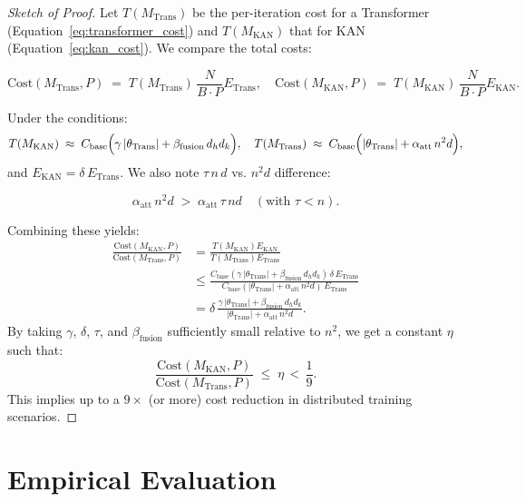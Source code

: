\documentclass[11pt]{article}
\begin{document}
\begin{proof}[Sketch of Proof]
Let $T(M_{\mathrm{Trans}})$ be the per-iteration cost for a Transformer (Equation~\ref{eq:transformer_cost}) and $T(M_{\mathrm{KAN}})$ that for KAN (Equation~\ref{eq:kan_cost}). We compare the total costs:

\[
    \mathrm{Cost}(M_{\mathrm{Trans}}, P) \;=\; T(M_{\mathrm{Trans}}) \,\frac{N}{B \cdot P} E_{\mathrm{Trans}}, 
\quad 
    \mathrm{Cost}(M_{\mathrm{KAN}}, P) \;=\; T(M_{\mathrm{KAN}}) \,\frac{N}{B \cdot P} E_{\mathrm{KAN}}.
\]

Under the conditions:
\[
    T(M_{\mathrm{KAN}}) \;\approx\; C_{\mathrm{base}} \Bigl(\gamma\,|\theta_{\mathrm{Trans}}| + \beta_{\mathrm{fusion}}\,d_h d_k\Bigr), 
\quad 
    T(M_{\mathrm{Trans}}) \;\approx\; C_{\mathrm{base}} \Bigl(|\theta_{\mathrm{Trans}}| + \alpha_{\mathrm{att}}\,n^2 d\Bigr),
\]
and $E_{\mathrm{KAN}} = \delta \, E_{\mathrm{Trans}}$. We also note $\tau\,n \,d$ vs. $n^2 d$ difference:

\[
    \alpha_{\mathrm{att}}\,n^2 d \;>\; \alpha_{\mathrm{att}} \,\tau\,n d \quad (\text{with }\tau < n).
\]

Combining these yields:
\begin{align*}
    \frac{\mathrm{Cost}(M_{\mathrm{KAN}}, P)}{\mathrm{Cost}(M_{\mathrm{Trans}}, P)}
    &= \frac{T(M_{\mathrm{KAN}}) E_{\mathrm{KAN}}}{T(M_{\mathrm{Trans}}) E_{\mathrm{Trans}}} 
    \\
    &\le \frac{C_{\mathrm{base}}(\gamma\,|\theta_{\mathrm{Trans}}| + \beta_{\mathrm{fusion}}\,d_h d_k)\,\delta\,E_{\mathrm{Trans}}}{C_{\mathrm{base}}(|\theta_{\mathrm{Trans}}| + \alpha_{\mathrm{att}}\,n^2 d)\,E_{\mathrm{Trans}}}
    \\
    &= \delta \,\frac{\gamma\,|\theta_{\mathrm{Trans}}| + \beta_{\mathrm{fusion}}\,d_h d_k}{|\theta_{\mathrm{Trans}}| + \alpha_{\mathrm{att}}\,n^2 d}.
\end{align*}
By taking $\gamma$, $\delta$, $\tau$, and $\beta_{\mathrm{fusion}}$ sufficiently small relative to $n^2$, we get a constant $\eta$ such that:
\[
    \frac{\mathrm{Cost}(M_{\mathrm{KAN}}, P)}{\mathrm{Cost}(M_{\mathrm{Trans}}, P)} \;\le\; \eta \,<\, \frac{1}{9}.
\]
This implies up to a $9\times$ (or more) cost reduction in distributed training scenarios.
\end{proof}

\section{Empirical Evaluation}
\end{document}
